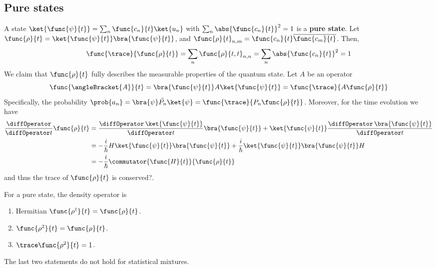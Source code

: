 \subsection{Pure states}
A state \(\ket{\func{\psi}{t}} = \sum_n \func{c_n}{t} \ket{u_n}\) with \(\sum_n \abs{\func{c_n}{t}}^2 = 1\) is a \textbf{pure state}. Let \(\func{\rho}{t} = \ket{\func{\psi}{t}} \bra{\func{\psi}{t}}\), and \(\func{\rho}{t}_{n,m} = \func{c_n}{t} \overline{\func{c_m}{t}}\). Then,
\begin{equation*}
    \func{\trace}{\func{\rho}{t}} = \sum_n \func{\rho}{t,t}_{n,n} = \sum_{n} \abs{\func{c_n}{t}}^2 = 1
\end{equation*}
We claim that \(\func{\rho}{t}\) fully describes the measurable properties of the quantum state. Let \(A\) be an operator
\begin{equation*}
    \func{\angleBracket{A}}{t} = \bra{\func{\psi}{t}} A \ket{\func{\psi}{t}} = \func{\trace}{A \func{\rho}{t}}
\end{equation*}
Specifically,  the probability \(\prob{a_n} = \bra{\psi} \tilde{P_n} \ket{\psi} = \func{\trace}{P_n \func{\rho}{t}}\). Moreover, for the time evolution we have
\begin{align*}
    \dfrac{\diffOperator}{\diffOperator t} \func{\rho}{t} &= \dfrac{\diffOperator \, \ket{\func{\psi}{t}}}{\diffOperator t} \bra{\func{\psi}{t}} + \ket{\func{\psi}{t}} \dfrac{\diffOperator \, \bra{\func{\psi}{t}}}{\diffOperator t} \\
    &= -\dfrac{i}{\hbar} H \ket{\func{\psi}{t}}\bra{\func{\psi}{t}} + \dfrac{i}{\hbar} \ket{\func{\psi}{t}}\bra{\func{\psi}{t}}   H  \\  
    &= -\frac{i}{\hbar} \commutator{\func{H}{t}}{\func{\rho}{t}}
\end{align*}
and thus the trace of \(\func{\rho}{t}\) is conserved?.
\begin{proposition}
    For a pure state, the density operator is
    \begin{enumerate}
        \item  Hermitian \(\func{\rho^{\dagger}}{t} = \func{\rho}{t}\).
        \item \(\func{\rho^2}{t} = \func{\rho}{t}\).
        \item \(\trace \func{\rho^2}{t} = 1\).
    \end{enumerate}
\end{proposition}
The last two statements do not hold for statistical mixtures.
